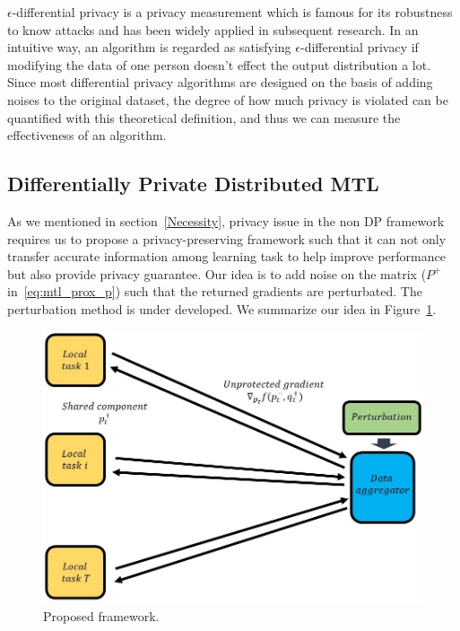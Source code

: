 $\epsilon$-differential privacy is a privacy measurement which is famous for its robustness to know attacks and has been widely applied in subsequent research. In an intuitive way, an algorithm is regarded as satisfying $\epsilon$-differential privacy if modifying the data of one person doesn't effect the output distribution a lot. Since most differential privacy algorithms are designed on the basis of adding noises to the original dataset, the degree of how much privacy is violated can be quantified with this theoretical definition, and thus we can measure the effectiveness of an algorithm. 


\subsection{Differentially Private Distributed MTL}

As we mentioned in section~\ref{Necessity}, privacy issue in the non DP framework requires us to propose a privacy-preserving framework such that it can not only transfer accurate information among learning task to help improve performance but also provide privacy guarantee. Our idea is to add noise on the matrix ($P^+$ in~\ref{eq:mtl_prox_p}) such that the returned gradients are perturbated. The perturbation method is under developed. We summarize our idea in Figure~\ref{fig:framework}.
\begin{figure}
\centering
\includegraphics[scale=0.35]{figure/framework.jpg}
\caption{Proposed framework.}
\label{fig:framework} 
\end{figure}
